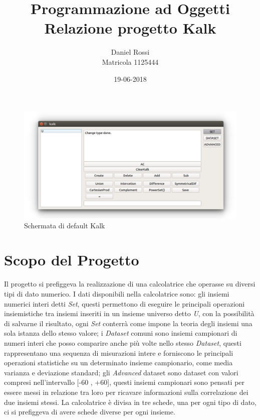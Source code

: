 \documentclass[a4paper,10pt]{article}
\begin{document}
        
        \title{Programmazione ad Oggetti\\Relazione progetto Kalk}
        \author{Daniel Rossi\\Matricola 1125444}
        \date{19-06-2018}
        \maketitle
        \begin{figure}[!h]
            \includegraphics[scale=0.5]{img/kalk.jpg}
                \caption{Schermata di default Kalk}
        \end{figure}
        \newpage
        \tableofcontents
        \newpage
        
        \section{Scopo del Progetto}
        Il progetto si prefiggeva la realizzazione di una calcolatrice che operasse su diversi tipi di dato numerico. I dati disponibili nella calcolatrice sono: gli insiemi numerici interi detti \textit{Set}, questi permettono di eseguire le principali operazioni insiemistiche tra insiemi inseriti in un insieme universo detto \textit{U}, con la possibilità di salvarne il risultato, ogni \textit{Set} conterrà come impone la teoria degli insiemi una sola istanza dello stesso valore; i \textit{Dataset} comuni sono insiemi campionari di numeri interi che posso comparire anche più volte nello stesso \textit{Dataset}, questi rappresentano una sequenza di misurazioni intere e forniscono le principali operazioni statistiche su un determinato insieme campionario, come media varianza e deviazione standard; gli \textit{Advanced} dataset sono dataset con valori compresi nell’intervallo [-60 , +60], questi insiemi campionari sono pensati per essere messi in relazione tra loro per ricavare informazioni sulla correlazione dei due insiemi stessi. La calcolatrice è divisa in tre schede, una per ogni tipo di dato, ci si prefiggeva di avere schede diverse per ogni insieme.
    
\end{document}
